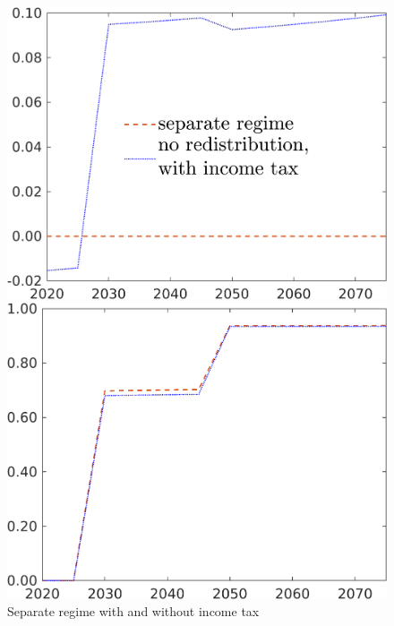 \begin{figure}[h!!]
	\centering
	\caption{Separate regime with and without income tax}\label{fig:comp_nored_pol}

\begin{minipage}[]{0.32\textwidth}
	\includegraphics[width=1\textwidth]{../../codding_model/own_basedOnFried/optimalPol_190722_tidiedUp/figures/all_July22/taul_DDCompEffOPT_T_NoTaus_pol3_spillover0_noskill0_sep1_xgrowth0_etaa0.79_lgd1_lff0.png}
\end{minipage}
\begin{minipage}[]{0.32\textwidth}
	\includegraphics[width=1\textwidth]{../../codding_model/own_basedOnFried/optimalPol_190722_tidiedUp/figures/all_July22/tauf_DDCompEffOPT_T_NoTaus_pol3_spillover0_noskill0_sep1_xgrowth0_etaa0.79_lgd0_lff0.png}

\end{minipage}
\end{figure}
